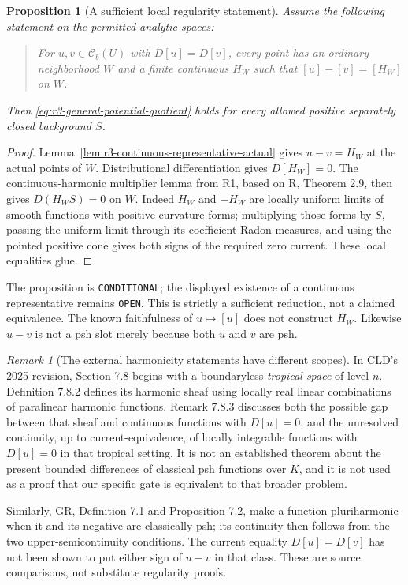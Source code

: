 \documentclass[11pt,a4paper]{article}
\numberwithin{equation}{section}
\newtheorem{proposition}[theorem]{Proposition}
\theoremstyle{definition}
\theoremstyle{remark}
\newtheorem{remark}[theorem]{Remark}
\newcommand{\Cb}{\mathcal C_b}
\begin{document}
\begin{proposition}[A sufficient local regularity statement]
\label{prop:r3-quotient-regularity-gate}
Assume the following statement on the permitted analytic spaces:
\begin{quote}
For $u,v\in\Cb(U)$ with $D[u]=D[v]$, every point has an
ordinary neighborhood $W$ and a finite continuous $H_W$ such that
$[u]-[v]=[H_W]$ on $W$.
\end{quote}
Then \eqref{eq:r3-general-potential-quotient} holds for every
allowed positive separately closed background $S$.
\end{proposition}

\begin{proof}
Lemma~\ref{lem:r3-continuous-representative-actual} gives
$u-v=H_W$ at the actual points of $W$. Distributional
differentiation gives $D[H_W]=0$. The continuous-harmonic
multiplier lemma from R1, based on \textup{R}, Theorem 2.9,
then gives $D(H_WS)=0$ on $W$. Indeed $H_W$ and $-H_W$
are locally uniform limits of smooth functions with positive
curvature forms; multiplying those forms by $S$, passing the
uniform limit through its coefficient-Radon measures, and using
the pointed positive cone gives both signs of the required zero
current. These local equalities glue.
\end{proof}

The proposition is \texttt{CONDITIONAL}; the displayed existence
of a continuous representative remains \texttt{OPEN}. This is
strictly a sufficient reduction, not a claimed equivalence.
The known faithfulness of $u\mapsto[u]$ does not construct
$H_W$. Likewise $u-v$ is not a psh slot merely because both
$u$ and $v$ are psh.

\begin{remark}[The external harmonicity statements have different scopes]
In CLD's 2025 revision, Section 7.8 begins with a boundaryless
\emph{tropical space} of level $n$. Definition 7.8.2 defines its
harmonic sheaf using locally real linear combinations of
paralinear harmonic functions. Remark 7.8.3 discusses both the
possible gap between that sheaf and continuous functions with
$D[u]=0$, and the unresolved continuity, up to current-equivalence,
of locally integrable functions with $D[u]=0$ in that tropical
setting. It is not an established theorem about the present
bounded differences of classical psh functions over $K$, and it
is not used as a proof that our specific gate is equivalent to
that broader problem.

Similarly, GR, Definition 7.1 and Proposition 7.2, make a function
pluriharmonic when it and its negative are classically psh; its
continuity then follows from the two upper-semicontinuity
conditions. The current equality $D[u]=D[v]$ has not been shown
to put either sign of $u-v$ in that class. These are source
comparisons, not substitute regularity proofs.
\end{remark}
\end{document}
